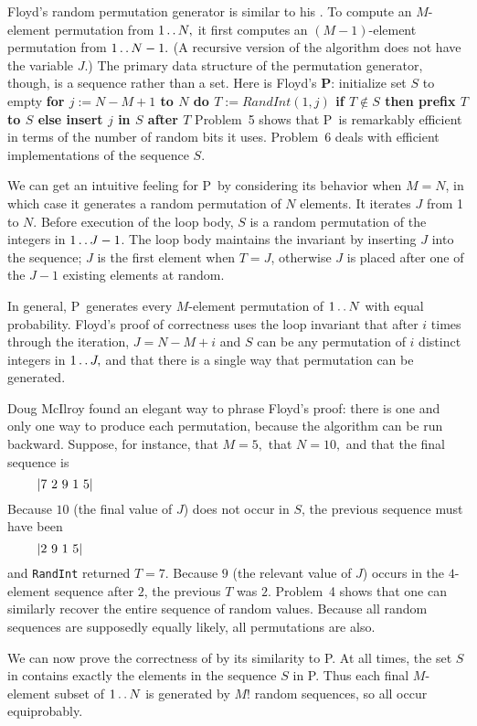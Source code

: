 Floyd's random permutation generator is similar to his . To compute an
$M$-element permutation from $1\mathinner{\ldotp\ldotp} N,$ it first computes an $(M-1)$-element
permutation from $1\mathinner{\ldotp\ldotp} N-1.$ (A recursive version of the algorithm does not
have the variable $J.$) The primary data structure of the permutation generator,
though, is a sequence rather than a set. Here is Floyd's {\bf\alg P}:
\begindisplay
\vbox{
\+ initialize set $S$ to empty\cr
\+\bf for $j := N - M + 1$ to $N$ do\cr
\+\quad $T := RandInt(1, j)$\cr
\+\qquad\bf if $T\not\in S$ then\cr
\+\qquad\quad prefix $T$ to $S$\cr
\+\qquad\bf else\cr
\+\qquad\quad insert $j$ in $S$ after $T$\cr}
\enddisplay
Problem~5 shows that \alg P\ is remarkably efficient in terms of the number of
random bits it uses. Problem~6 deals with efficient implementations of the
sequence $S.$

We can get an intuitive feeling for \alg P\ by considering its behavior when
$M=N$, in which case it generates a random permutation of $N$ elements. It
iterates $J$ from 1 to $N$. Before execution of the loop body, $S$ is a random
permutation of the integers in $1\mathinner{\ldotp\ldotp} J-1$. The loop body maintains the
invariant by inserting $J$ into the sequence; $J$ is the first element when
$T=J$, otherwise $J$ is placed after one of the $J-1$ existing elements at
random.

In general, \alg P\ generates every $M$-element permutation of $1\mathinner{\ldotp\ldotp} N$ with
equal probability. Floyd's proof of correctness uses the loop invariant that
after $i$ times through the iteration, $J=N-M+i$ and $S$ can be any permutation
of $i$ distinct integers in $1\mathinner{\ldotp\ldotp} J,$ and that there is a single way that
permutation can be generated.

Doug McIlroy found an elegant way to phrase Floyd's proof: there is one and only
one way to produce each permutation, because the algorithm can be run backward.
Suppose, for instance, that $M=5,$ that $N=10,$ and that the final sequence is
$$\vbox{
|7 2 9 1 5|
}$$
Because $10$ (the final value of $J$) does not occur in $S$, the previous
sequence must have been
$$\vbox{
|2 9 1 5|
}$$
and {\tt RandInt} returned $T=7.$ Because $9$ (the relevant value of $J$) occurs
in the $4$-element sequence after $2$, the previous $T$ was $2$. Problem~4 shows
that one can similarly recover the entire sequence of random values. Because all
random sequences are supposedly equally likely, all permutations are also.

We can now prove the correctness of  by its similarity to \alg P. At all
times, the set $S$ in  contains exactly the elements in the sequence $S$
in \alg P. Thus each final $M$-element subset of $1\mathinner{\ldotp\ldotp} N$ is generated by
$M!$ random sequences, so all occur equiprobably.

